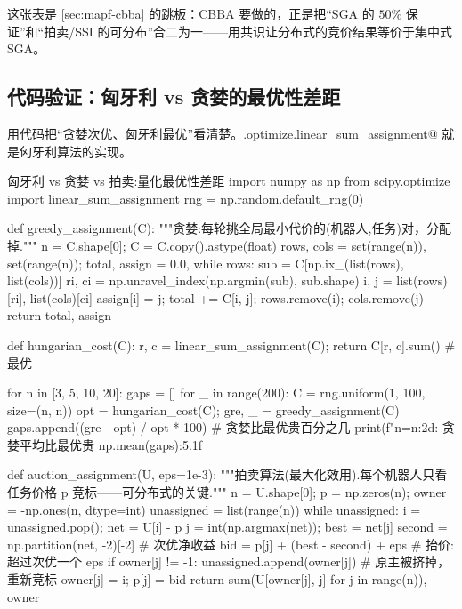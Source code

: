 这张表是 \cref{sec:mapf-cbba} 的跳板：CBBA 要做的，正是把“SGA 的 $50\%$ 保证”和“拍卖/SSI 的可分布”合二为一——用共识让分布式的竞价结果等价于集中式 SGA。

\subsection{代码验证：匈牙利 vs 贪婪的最优性差距}
\label{sec:mapf-assign-code}

用代码把“贪婪次优、匈牙利最优”看清楚。\verb@scipy.optimize.linear_sum_assignment@ 就是匈牙利算法的实现。

\begin{codebox}[Python]{匈牙利 vs 贪婪 vs 拍卖:量化最优性差距}
import numpy as np
from scipy.optimize import linear_sum_assignment
rng = np.random.default_rng(0)

def greedy_assignment(C):
    """贪婪:每轮挑全局最小代价的(机器人,任务)对，分配掉."""
    n = C.shape[0]; C = C.copy().astype(float)
    rows, cols = set(range(n)), set(range(n)); total, assign = 0.0, {}
    while rows:
        sub = C[np.ix_(list(rows), list(cols))]
        ri, ci = np.unravel_index(np.argmin(sub), sub.shape)
        i, j = list(rows)[ri], list(cols)[ci]
        assign[i] = j; total += C[i, j]; rows.remove(i); cols.remove(j)
    return total, assign

def hungarian_cost(C):
    r, c = linear_sum_assignment(C); return C[r, c].sum()     # 最优

for n in [3, 5, 10, 20]:
    gaps = []
    for _ in range(200):
        C = rng.uniform(1, 100, size=(n, n))
        opt = hungarian_cost(C); gre, _ = greedy_assignment(C)
        gaps.append((gre - opt) / opt * 100)                  # 贪婪比最优贵百分之几
    print(f"n={n:2d}: 贪婪平均比最优贵 {np.mean(gaps):5.1f}%

def auction_assignment(U, eps=1e-3):
    """拍卖算法(最大化效用).每个机器人只看任务价格 p 竞标——可分布式的关键."""
    n = U.shape[0]; p = np.zeros(n); owner = -np.ones(n, dtype=int)
    unassigned = list(range(n))
    while unassigned:
        i = unassigned.pop(); net = U[i] - p
        j = int(np.argmax(net)); best = net[j]
        second = np.partition(net, -2)[-2]                    # 次优净收益
        bid = p[j] + (best - second) + eps                    # 抬价:超过次优一个 eps
        if owner[j] != -1: unassigned.append(owner[j])        # 原主被挤掉，重新竞标
        owner[j] = i; p[j] = bid
    return sum(U[owner[j], j] for j in range(n)), owner
\end{codebox}

